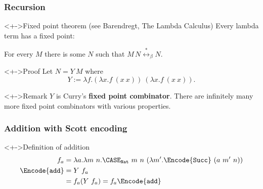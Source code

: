 \documentclass[pdftex,aspectratio=169]{beamer}
\begin{document}
\begin{frame}
  \frametitle{Recursion}
  \begin{alertblock}<+->{Fixed point theorem (see Barendregt, The Lambda Calculus)}
    Every lambda term has a fixed point:

    For every $M$ there is some $N$ such that
    $
    M\, N \overset{\ast}{\leftrightarrow}_\beta N
    $.
  \end{alertblock}
  \begin{exampleblock}<+->{Proof}
    Let $N = Y~M$ where
    \begin{displaymath}
      Y := \lambda f.(\lambda x.f~(x~x))~(\lambda x.f~(x~x)).
    \end{displaymath}
  \end{exampleblock}
  \begin{block}<+->{Remark}
    $Y$ is Curry's \textbf{fixed point combinator}. There are infinitely
    many more fixed point combinators with various properties.
  \end{block}
\end{frame}
\begin{frame}
  \frametitle{Addition with Scott encoding}
  \begin{block}<+->{Definition of addition}
    \vspace{-\baselineskip}
    \begin{align*}
      f_a &= \lambda a. \lambda m\ n. \CASE_{\mathtt{Nat}}\ m\ n\
            (\lambda m'. \Encode{\mathtt{Succ}}\ (a\ m'\ n)) \\
      \Encode{\mathtt{add}} &= Y\  f_a \\
          &= f_a (Y\ f_a) = f_a \Encode{\mathtt{add}}
    \end{align*}
  \end{block}
\end{frame}
\end{document}
